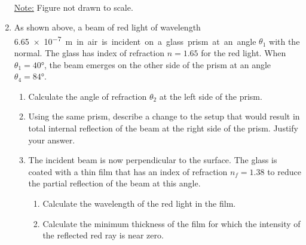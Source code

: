 \documentclass{../../../oss-classkick}
\begin{document}
\begin{enumerate}[leftmargin=15pt]
  \begin{center}
    \\
    \underline{Note:} Figure not drawn to scale.
  \end{center}
\item As shown above, a beam of red light of wavelength \SI{6.65e-7}\metre in
  air is incident on a glass prism at an angle $\theta_1$ with the normal. The
  glass has index of refraction $n=1.65$ for the red light. When
  $\theta_1=\ang{40}$, the beam emerges on the other side of the prism at an
  angle $\theta_4=\ang{84}$.
  \begin{enumerate}
  \item Calculate the angle of refraction $\theta_2$ at the left side of the
    prism.
  \item Using the same prism, describe a change to the setup that would result
    in total internal reflection of the beam at the right side of the prism.
    Justify your answer.
  \item The incident beam is now perpendicular to the surface. The glass is
    coated with a thin film that has an index of refraction $n_f = 1.38$ to
    reduce the partial reflection of the beam at this angle.
    \begin{enumerate}
    \item Calculate the wavelength of the red light in the film.
    \item Calculate the minimum thickness of the film for which the intensity
      of the reflected red ray is near zero.
    \end{enumerate}
  \end{enumerate}
  \newpage


\end{enumerate}
\end{document}
